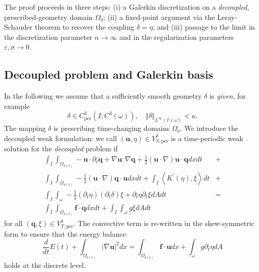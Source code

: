 \documentclass[10pt,a4paper]{article}
\numberwithin{equation}{section}
\begin{document}
The proof proceeds in three steps: (i) a Galerkin discretization on a \emph{decoupled}, prescribed-geometry domain $\Omega_\delta$; (ii) a fixed-point argument via the Leray-Schauder theorem to recover the coupling $\delta = \eta$; and (iii) passage to the limit in the discretization parameter $n\to\infty$ and in the regularization parameters $\varepsilon,\sigma\to 0$.

\subsection{Decoupled problem and Galerkin basis}
In the following we assume that a sufficiently smooth geometry $\delta$ is \emph{given}, for example
\[
\delta\in C_{\text{per}}^{3}\left(I;C^{3}\left(\omega\right)\right),\quad\left\Vert \delta\right\Vert _{L^{\infty}\left(I\times\omega\right)}<\kappa.
\]
The mapping $\delta$ is prescribing  time-changing domains $\Omega_{\delta}$. We introduce the decoupled weak formulation: we call $(\mathbf{u},\eta)\in V_{S, \text{per}}^{\delta}$ is a time-periodic weak solution for the \emph{decoupled} problem if
\begin{equation}\label{eq:dec-reg-per-wf}
\begin{aligned}\int_{I}\int_{\Omega_{\delta\left(t\right)}}-\mathbf{u}\cdot\partial_{t}\mathbf{q}+\nabla\mathbf{u}:\nabla\mathbf{q}+\frac{1}{2}\left(\mathbf{u}\cdot\nabla\right)\mathbf{u}\cdot\mathbf{q}dxdt & +\\
\int_{I}\int_{\Omega_{\delta\left(t\right)}}-\frac{1}{2}\left(\mathbf{u}\cdot\nabla\right)\mathbf{q}\cdot\mathbf{u}dxdt+\int_{I}\left\langle K^{\prime}\left(\eta\right),\xi\right\rangle dt & +\\
\int_{I}\int_{\omega}-\frac{1}{2}\left(\partial_{t}\eta\right)\left(\partial_{t}\delta\right)\xi+\partial_{t}\eta\partial_{t}\xi dAdt & =\\
\int_{I}\int_{\Omega_{\delta\left(t\right)}}\mathbf{f}\cdot\mathbf{q}dxdt+\int_{I}\int_{\omega}g\xi dAdt
\end{aligned}
\end{equation}
for all $(\mathbf{q},\xi)\in V_{T,\text{per}}^{\delta}$. The convective term is re-written in the skew-symmetric form to ensure that the energy balance 
\begin{equation}\label{eqn:energy-1-dec}
\frac{d}{dt}E\left(t\right)+\int_{\Omega_{\delta\left(t\right)}}\left|\nabla\mathbf{u}\right|^{2}dx=\int_{\Omega_{\delta\left(t\right)}}\mathbf{f}\cdot\mathbf{u}dx+\int_{\omega}g\partial_{t}\eta dA
\end{equation}
holds at the discrete level.
\end{document}
